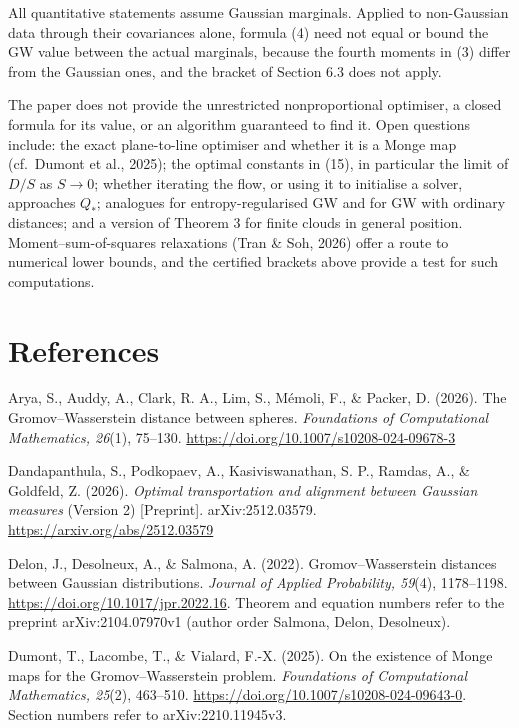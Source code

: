 \documentclass[
  british,
  11pt,
  a4paper,
]{article}
\begin{document}
All quantitative statements assume Gaussian marginals. Applied to
non-Gaussian data through their covariances alone, formula (4) need not
equal or bound the GW value between the actual marginals, because the
fourth moments in (3) differ from the Gaussian ones, and the bracket of
Section 6.3 does not apply.

The paper does not provide the unrestricted nonproportional optimiser, a
closed formula for its value, or an algorithm guaranteed to find it.
Open questions include: the exact plane-to-line optimiser and whether it
is a Monge map (cf.~Dumont et al., 2025); the optimal constants in (15),
in particular the limit of \(D/S\) as \(S\to0\); whether iterating the
flow, or using it to initialise a solver, approaches \(Q_*\); analogues
for entropy-regularised GW and for GW with ordinary distances; and a
version of Theorem 3 for finite clouds in general position.
Moment--sum-of-squares relaxations (Tran \& Soh, 2026) offer a route to
numerical lower bounds, and the certified brackets above provide a test
for such computations.

\section{References}\label{references}

Arya, S., Auddy, A., Clark, R. A., Lim, S., Mémoli, F., \& Packer, D.
(2026). The Gromov--Wasserstein distance between spheres.
\emph{Foundations of Computational Mathematics, 26}(1), 75--130.
\url{https://doi.org/10.1007/s10208-024-09678-3}

Dandapanthula, S., Podkopaev, A., Kasiviswanathan, S. P., Ramdas, A., \&
Goldfeld, Z. (2026). \emph{Optimal transportation and alignment between
Gaussian measures} (Version 2) {[}Preprint{]}. arXiv:2512.03579.
\url{https://arxiv.org/abs/2512.03579}

Delon, J., Desolneux, A., \& Salmona, A. (2022). Gromov--Wasserstein
distances between Gaussian distributions. \emph{Journal of Applied
Probability, 59}(4), 1178--1198.
\url{https://doi.org/10.1017/jpr.2022.16}. Theorem and equation numbers
refer to the preprint arXiv:2104.07970v1 (author order Salmona, Delon,
Desolneux).

Dumont, T., Lacombe, T., \& Vialard, F.-X. (2025). On the existence of
Monge maps for the Gromov--Wasserstein problem. \emph{Foundations of
Computational Mathematics, 25}(2), 463--510.
\url{https://doi.org/10.1007/s10208-024-09643-0}. Section numbers refer
to arXiv:2210.11945v3.
\end{document}
